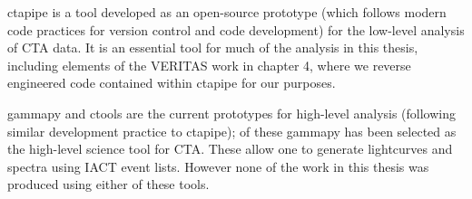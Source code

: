 ctapipe is a tool developed as an open-source prototype (which follows modern code practices for version control and code development) for the low-level analysis of CTA data. It is an essential tool for much of the analysis in this thesis, including elements of the VERITAS work in chapter 4, where we reverse engineered code contained within ctapipe for our purposes.

gammapy and ctools are the current prototypes for high-level analysis (following similar development practice to ctapipe); of these gammapy has been selected as the high-level science tool for CTA. These allow one to generate lightcurves and spectra using IACT event lists. However none of the work in this thesis was produced using either of these tools.

